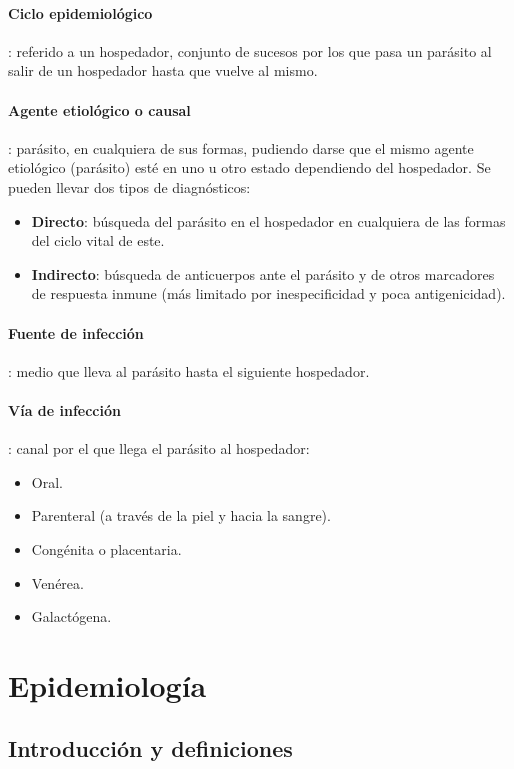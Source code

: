 \documentclass[10pt,a4paper,onecolumn,openany]{book}
\begin{document}
\paragraph{Ciclo epidemiológico}: referido a un hospedador, conjunto de sucesos por los que pasa un parásito al salir de un hospedador hasta que vuelve al mismo.
\paragraph{Agente etiológico o causal}: parásito, en cualquiera de sus formas, pudiendo darse que el mismo agente etiológico (parásito) esté en uno u otro estado dependiendo del hospedador. Se pueden llevar dos tipos de diagnósticos:
\begin{itemize}[itemsep=0pt,parsep=0pt,topsep=0pt,partopsep=0pt]
	\item \textbf{Directo}: búsqueda del parásito en el hospedador en cualquiera de las formas del ciclo vital de este.
	\item\textbf{Indirecto}: búsqueda de anticuerpos ante el parásito y de otros marcadores de respuesta inmune (más limitado por inespecificidad y poca antigenicidad).
\end{itemize}
\paragraph{Fuente de infección}: medio que lleva al parásito hasta el siguiente hospedador.
\paragraph{Vía de infección}: canal por el que llega el parásito al hospedador:
\begin{itemize}[itemsep=0pt,parsep=0pt,topsep=0pt,partopsep=0pt]
	\item Oral.
	\item Parenteral (a través de la piel y hacia la sangre).
	\item Congénita o placentaria.
	\item Venérea.
	\item Galactógena.
\end{itemize}
\section{Epidemiología}
\subsection{Introducción y definiciones}
\end{document}
